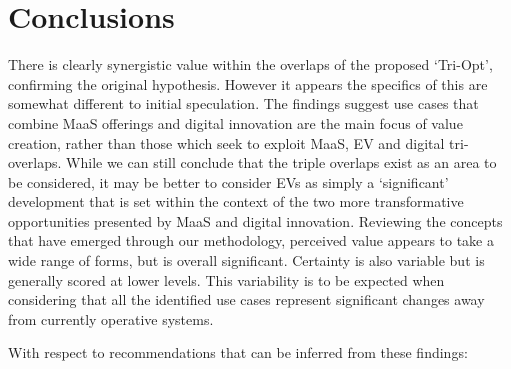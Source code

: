 \documentclass[b5paper,10pt]{article}
\begin{document}
 


\section{Conclusions}\label{conclusion}


There is clearly synergistic value within the overlaps of the proposed
`Tri-Opt', confirming the original hypothesis. However it appears the
specifics of this are somewhat different to initial speculation. The
findings suggest use cases that combine MaaS offerings and digital
innovation are the main focus of value creation, rather than those
which seek to exploit MaaS, EV and digital tri-overlaps. While we can
still conclude that the triple overlaps exist as an area to be
considered, it may be better to consider EVs as simply a `significant'
development that is set within the context of the two more
transformative opportunities presented by MaaS and digital
innovation. Reviewing the concepts that have emerged through our
methodology, perceived value appears to take a wide range of forms,
but is overall significant. Certainty is also variable but is
generally scored at lower levels. This variability is to be expected
when considering that all the identified use cases represent
significant changes away from currently operative systems.

With respect to recommendations that can be inferred from these findings:
\end{document}
